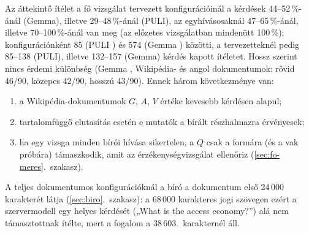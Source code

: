 Az áttekintő ítélet a fő vizsgálat tervezett konfigurációinál a kérdések 44--52\,\%-ánál (Gemma), illetve
29--48\,\%-ánál (PULI), az egyhívásosaknál 47--65\,\%-ánál, illetve 70--100\,\%-ánál van meg (az előzetes
vizsgálatban mindenütt 100\,\%); konfigurációnként 85 (PULI ) és 574 (Gemma ) közötti, a tervezetteknél pedig
85--138 (PULI), illetve 132--157 (Gemma) kérdés kapott ítéletet. Hossz szerint nincs érdemi különbség (Gemma
, Wikipédia- és angol dokumentumok: rövid 46/90, közepes 42/90, hosszú 43/90). Ennek három következménye van:
\begin{enumerate}[label=(\arabic*),leftmargin=*,itemsep=1pt,topsep=2pt]
\item a Wikipédia-dokumentumok $G$, $A$, $V$ értéke kevesebb kérdésen alapul;
\item tartalomfüggő elutasítás esetén e mutatók a bírált részhalmazra érvényesek;
\item ha egy vizsga minden bírói hívása sikertelen, a $Q$ csak a formára (és a vak próbára) támaszkodik, amit az érzékenységvizsgálat ellenőriz (\ref{sec:fo-meres}.~szakasz).
\end{enumerate}
A teljes dokumentumos
konfigurációknál a bíró a dokumentum első 24\,000 karakterét látja (\ref{sec:biro}.~szakasz): a 68\,000 karakteres
jogi szövegen ezért a szervermodell egy helyes kérdését („What is the access economy?”) alá nem támasztottnak
ítélte, mert a fogalom a 38\,603.~karakternél áll.
